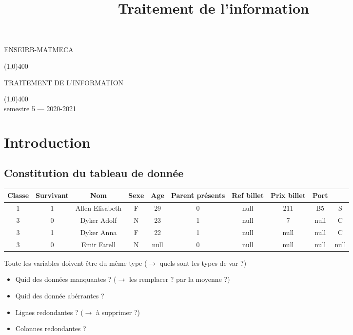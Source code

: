 \documentclass[a4paper]{report}
\title{Traitement de l'information}
\begin{document}
\begin{titlepage}
  \begin{center}
    ENSEIRB-MATMECA
    \vspace{6cm}


  \line(1,0){400} \\[0.4cm]

    \begin{Huge}
      T{\huge RAITEMENT} D{\huge E L'}I{\huge NFORMATION}

    \end{Huge}
    \vspace{0.4cm}
  \line(1,0){400} \\[0.4cm]
  \vspace{15cm}
  semestre 5 --- 2020-2021
  \end{center}
\end{titlepage}
\tableofcontents
\chapter{Introduction}
\section{Constitution du tableau de donnée}

\begin{tabular}
  {|c|c|c|c|c|c|c|c|c|c|}
  \hline
  Classe & Survivant & Nom & Sexe & Age & Parent présents & Ref billet & Prix billet & Port \\
  \hline
  \hline
  1&1&Allen Elisabeth&F&29&0&null&211&B5&S\\
  \hline
  3&0&Dyker Adolf&N&23&1&null&7&null&C\\
  \hline
  3&1&Dyker Anna&F&22&1&null&null&null&C\\
  \hline
  3&0&Emir Farell&N&null&0&null&null&null&null\\
  \hline
\end{tabular}

Toute les variables doivent être du même type ($\rightarrow$ quels sont les types de var ?) \\
\begin{itemize}
  \item Quid des données manquantes ? ($\rightarrow$ les remplacer ? par la moyenne ?)
    \item Quid des donnée abérrantes ?
  \item Lignes redondantes ? ($\rightarrow$ à supprimer ?)
    \item Colonnes redondantes ?
\end{itemize}
\end{document}
